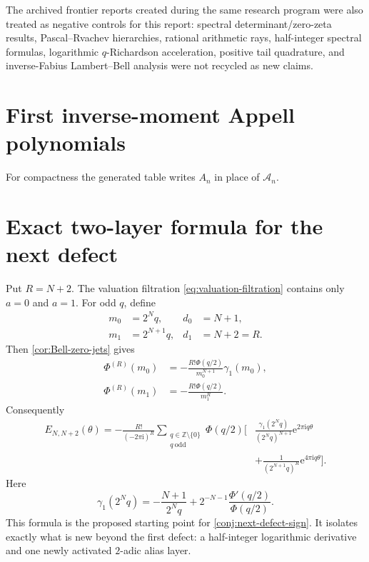 \documentclass[11pt]{article}
\numberwithin{equation}{section}
\theoremstyle{definition}
\theoremstyle{remark}
\newcommand{\Z}{\mathbb Z}
\newcommand{\e}{\mathrm e}
\newcommand{\iu}{\mathrm i}
\newcommand{\Acal}{\mathscr A}
\begin{document}
The archived frontier reports created during the same research program were also treated as negative controls for this report: spectral determinant/zero-zeta results, Pascal--Rvachev hierarchies, rational arithmetic rays, half-integer spectral formulas, logarithmic $q$-Richardson acceleration, positive tail quadrature, and inverse-Fabius Lambert--Bell analysis were not recycled as new claims.

\section{First inverse-moment Appell polynomials}
\label{app:Appell-table}

For compactness the generated table writes $A_n$ in place of $\Acal_n$.


\section{Exact two-layer formula for the next defect}
\label{app:next-defect}

Put $R=N+2$.  The valuation filtration \eqref{eq:valuation-filtration} contains only $a=0$ and $a=1$.  For odd $q$, define
\begin{align}
 m_0&=2^Nq,&d_0&=N+1,\\
 m_1&=2^{N+1}q,&d_1&=N+2=R.
\end{align}
Then \cref{cor:Bell-zero-jets} gives
\begin{align}
 \Phi^{(R)}(m_0)
 &=-\frac{R!\Phi(q/2)}{m_0^{N+1}}\gamma_1(m_0),
 \label{eq:next-defect-layer0}\\
 \Phi^{(R)}(m_1)
 &=-\frac{R!\Phi(q/2)}{m_1^R}.
 \label{eq:next-defect-layer1}
\end{align}
Consequently
\begin{equation}
\boxed{
\begin{aligned}
 E_{N,N+2}(\theta)
 =-\frac{R!}{(-2\pi\iu)^R}
 \sum_{\substack{q\in\Z\setminus\{0\}\\q\ \mathrm{odd}}}
 \Phi(q/2)\Bigg[&
 \frac{\gamma_1(2^Nq)}{(2^Nq)^{N+1}}
 \e^{2\pi\iu q\theta}\\
 &+\frac{1}{(2^{N+1}q)^R}
 \e^{4\pi\iu q\theta}\Bigg].
\end{aligned}}
\label{eq:next-defect-exact}
\end{equation}
Here
\begin{equation}
 \gamma_1(2^Nq)
 =-\frac{N+1}{2^Nq}
 +2^{-N-1}\frac{\Phi'(q/2)}{\Phi(q/2)}.
 \label{eq:next-defect-gamma1}
\end{equation}
This formula is the proposed starting point for \cref{conj:next-defect-sign}.  It isolates exactly what is new beyond the first defect: a half-integer logarithmic derivative and one newly activated $2$-adic alias layer.
\end{document}
